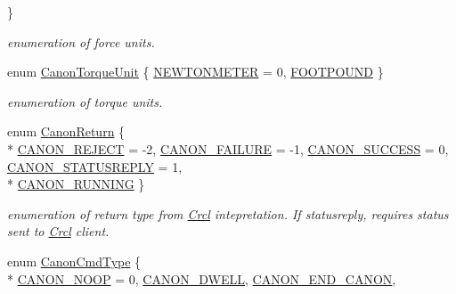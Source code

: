 \begin{DoxyCompactItemize}
 \}
\begin{DoxyCompactList}\small\item\em enumeration of force units. \end{DoxyCompactList}\item 
enum \hyperlink{namespaceRCS_aad43ee626dc2b93364a9276cd0190b38}{Canon\-Torque\-Unit} \{ \hyperlink{namespaceRCS_aad43ee626dc2b93364a9276cd0190b38a8455a50078c65f9939ae9093d87df9ce}{N\-E\-W\-T\-O\-N\-M\-E\-T\-E\-R} = 0, 
\hyperlink{namespaceRCS_aad43ee626dc2b93364a9276cd0190b38a90a01e4c469158168e9bbfed53909fa4}{F\-O\-O\-T\-P\-O\-U\-N\-D}
 \}
\begin{DoxyCompactList}\small\item\em enumeration of torque units. \end{DoxyCompactList}\item 
enum \hyperlink{namespaceRCS_a604ddc76f1c860e79ec060339a68dc79}{Canon\-Return} \{ \\*
\hyperlink{namespaceRCS_a604ddc76f1c860e79ec060339a68dc79ae784c3b29210b49f3548ad8ccbe35688}{C\-A\-N\-O\-N\-\_\-\-R\-E\-J\-E\-C\-T} = -\/2, 
\hyperlink{namespaceRCS_a604ddc76f1c860e79ec060339a68dc79a8046a92ede63076a4b9c98aa4099e3ea}{C\-A\-N\-O\-N\-\_\-\-F\-A\-I\-L\-U\-R\-E} = -\/1, 
\hyperlink{namespaceRCS_a604ddc76f1c860e79ec060339a68dc79a45f0039600f4e6b521a58e021609ea22}{C\-A\-N\-O\-N\-\_\-\-S\-U\-C\-C\-E\-S\-S} = 0, 
\hyperlink{namespaceRCS_a604ddc76f1c860e79ec060339a68dc79ae5d8cf70f462c3e4aee8050f308132fb}{C\-A\-N\-O\-N\-\_\-\-S\-T\-A\-T\-U\-S\-R\-E\-P\-L\-Y} = 1, 
\\*
\hyperlink{namespaceRCS_a604ddc76f1c860e79ec060339a68dc79a01dce2ee696426c95a68ffe191ccd643}{C\-A\-N\-O\-N\-\_\-\-R\-U\-N\-N\-I\-N\-G}
 \}
\begin{DoxyCompactList}\small\item\em enumeration of return type from \hyperlink{namespaceCrcl}{Crcl} intepretation. If statusreply, requires status sent to \hyperlink{namespaceCrcl}{Crcl} client. \end{DoxyCompactList}\item 
enum \hyperlink{namespaceRCS_a55bbd74afb87a330de1b95af65f4cb75}{Canon\-Cmd\-Type} \{ \\*
\hyperlink{namespaceRCS_a55bbd74afb87a330de1b95af65f4cb75aec778933c8e1af18ea16550268eebaaa}{C\-A\-N\-O\-N\-\_\-\-N\-O\-O\-P} = 0, 
\hyperlink{namespaceRCS_a55bbd74afb87a330de1b95af65f4cb75a39055f1d78c4ea71a7eb300b059dc330}{C\-A\-N\-O\-N\-\_\-\-D\-W\-E\-L\-L}, 
\hyperlink{namespaceRCS_a55bbd74afb87a330de1b95af65f4cb75afe807fccfca39c61a14d5c1a454b216d}{C\-A\-N\-O\-N\-\_\-\-E\-N\-D\-\_\-\-C\-A\-N\-O\-N}, 

\end{DoxyCompactItemize}
